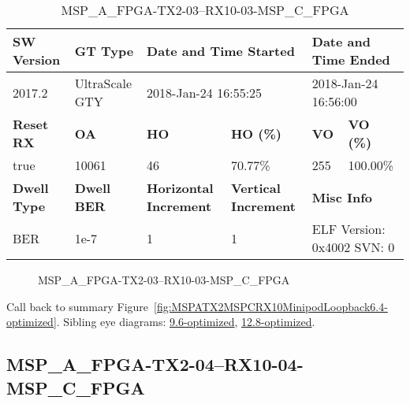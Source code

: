 \begin{table}[h]
\centering
\caption{MSP\_A\_FPGA-TX2-03--RX10-03-MSP\_C\_FPGA}
\label{tab:MSPAFPGATX203RX1003MSPCFPGA6.4-optimized}
\begin{tabular}{@{}|l|l|l|l|l|l|@{}}
\toprule
\textbf{SW Version}                & \textbf{GT Type}   & \multicolumn{2}{l|}{\textbf{Date and Time Started}}            & \multicolumn{2}{l|}{\textbf{Date and Time Ended}}        \\ \midrule
2017.2                       & UltraScale GTY          & \multicolumn{2}{l|}{2018-Jan-24 16:55:25}                   & \multicolumn{2}{l|}{2018-Jan-24 16:56:00}               \\ \midrule
\textbf{Reset RX}                  & \textbf{OA} & \textbf{HO}   & \textbf{HO (\%)} & \textbf{VO} & \textbf{VO (\%)} \\ \midrule
true & 10061        & 46          & 70.77\%        & 255        & 100.00\%       \\ \midrule
\textbf{Dwell Type}                & \textbf{Dwell BER} & \textbf{Horizontal Increment} & \textbf{Vertical Increment}    & \multicolumn{2}{l|}{\textbf{Misc Info}}                  \\ \midrule
BER                            & 1e-7        & 1        & 1           & \multicolumn{2}{l|}{ELF Version: 0x4002 SVN: 0}                         \\ \bottomrule
\end{tabular}
\end{table}

\begin{figure}[h]
\caption{MSP\_A\_FPGA-TX2-03--RX10-03-MSP\_C\_FPGA} \label{fig:MSPAFPGATX203RX1003MSPCFPGA6.4-optimized}
\end{figure}

Call back to summary Figure~\ref{fig:MSPATX2MSPCRX10MinipodLoopback6.4-optimized}.
Sibling eye diagrams: \hyperref[sec:MSPAFPGATX203RX1003MSPCFPGA9.6-optimized]{9.6-optimized}, \hyperref[sec:MSPAFPGATX203RX1003MSPCFPGA12.8-optimized]{12.8-optimized}.

\clearpage
\newpage


\subsection{MSP\_A\_FPGA-TX2-04--RX10-04-MSP\_C\_FPGA}\label{sec:MSPAFPGATX204RX1004MSPCFPGA6.4-optimized}

